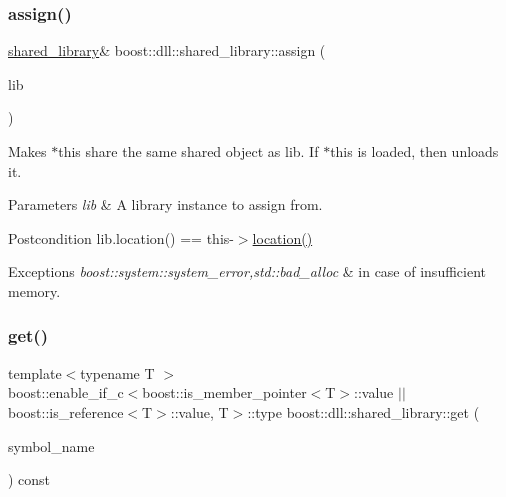 \subsubsection{\texorpdfstring{assign()}{assign()}\hspace{0.1cm}{\footnotesize\ttfamily [2/2]}}
{\footnotesize\ttfamily \hyperlink{a01708}{shared\+\_\+library}\& boost\+::dll\+::shared\+\_\+library\+::assign (\begin{DoxyParamCaption}\item[{const \hyperlink{a01708}{shared\+\_\+library} \&}]{lib }\end{DoxyParamCaption})\hspace{0.3cm}{\ttfamily [inline]}}

Makes $\ast$this share the same shared object as lib. If $\ast$this is loaded, then unloads it.


\begin{DoxyParams}{Parameters}
{\em lib} & A library instance to assign from. \\
\hline
\end{DoxyParams}
\begin{DoxyPostcond}{Postcondition}
lib.\+location() == this-\/$>$\hyperlink{a01708_a6de31089479b7e508d7fb67e752a635e}{location()} 
\end{DoxyPostcond}

\begin{DoxyExceptions}{Exceptions}
{\em boost\+::system\+::system\+\_\+error,std\+::bad\+\_\+alloc} & in case of insufficient memory. \\
\hline
\end{DoxyExceptions}
\mbox{\label{a01708_a95aacb882bafadf535337c9c5cc0bea1}} 
\subsubsection{\texorpdfstring{get()}{get()}\hspace{0.1cm}{\footnotesize\ttfamily [1/4]}}
{\footnotesize\ttfamily template$<$typename T $>$ \\
boost\+::enable\+\_\+if\+\_\+c$<$boost\+::is\+\_\+member\+\_\+pointer$<$T$>$\+::value $\vert$$\vert$ boost\+::is\+\_\+reference$<$T$>$\+::value, T$>$\+::type boost\+::dll\+::shared\+\_\+library\+::get (\begin{DoxyParamCaption}\item[{const std\+::string \&}]{symbol\+\_\+name }\end{DoxyParamCaption}) const\hspace{0.3cm}{\ttfamily [inline]}}

